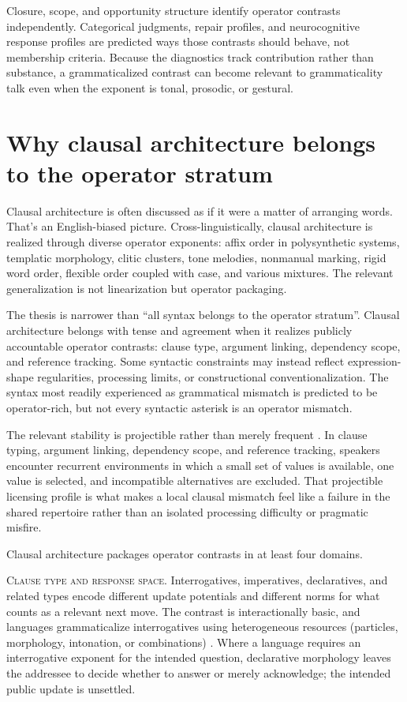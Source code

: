 \documentclass[12pt,letterpaper]{article}
\begin{document}
Closure, scope, and opportunity structure identify operator contrasts independently. Categorical judgments, repair profiles, and neurocognitive response profiles are predicted ways those contrasts should behave, not membership criteria. Because the diagnostics track contribution rather than substance, a grammaticalized contrast can become relevant to grammaticality talk even when the exponent is tonal, prosodic, or gestural.

\section{Why clausal architecture belongs to the operator stratum}

Clausal architecture is often discussed as if it were a matter of arranging words. That's an English-biased picture. Cross-linguistically, clausal architecture is realized through diverse operator exponents: affix order in polysynthetic systems, templatic morphology, clitic clusters, tone melodies, nonmanual marking, rigid word order, flexible order coupled with case, and various mixtures. The relevant generalization is not linearization but operator packaging.

The thesis is narrower than \enquote{all syntax belongs to the operator stratum}. Clausal architecture belongs with tense and agreement when it realizes publicly accountable operator contrasts: clause type, argument linking, dependency scope, and reference tracking. Some syntactic constraints may instead reflect expression-shape regularities, processing limits, or constructional conventionalization. The syntax most readily experienced as grammatical mismatch is predicted to be operator-rich, but not every syntactic asterisk is an operator mismatch.

The relevant stability is projectible rather than merely frequent \citep{author2026notEveryStableCluster}. In clause typing, argument linking, dependency scope, and reference tracking, speakers encounter recurrent environments in which a small set of values is available, one value is selected, and incompatible alternatives are excluded. That projectible licensing profile is what makes a local clausal mismatch feel like a failure in the shared repertoire rather than an isolated processing difficulty or pragmatic misfire.

Clausal architecture packages operator contrasts in at least four domains.

\textsc{Clause type and response space.} Interrogatives, imperatives, declaratives, and related types encode different update potentials and different norms for what counts as a relevant next move. The contrast is interactionally basic, and languages grammaticalize interrogatives using heterogeneous resources (particles, morphology, intonation, or combinations) \citep{dryer2013,ladd2008}. Where a language requires an interrogative exponent for the intended question, declarative morphology leaves the addressee to decide whether to answer or merely acknowledge; the intended public update is unsettled.
\end{document}
